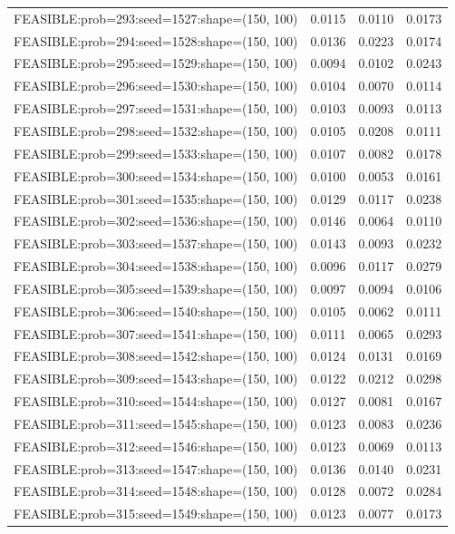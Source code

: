 \begin{longtable}{lccc}
FEASIBLE:prob=293:seed=1527:shape=(150, 100) &   0.0115 & 0.0110 & 0.0173 \\
FEASIBLE:prob=294:seed=1528:shape=(150, 100) &   0.0136 & 0.0223 & 0.0174 \\
FEASIBLE:prob=295:seed=1529:shape=(150, 100) &   0.0094 & 0.0102 & 0.0243 \\
FEASIBLE:prob=296:seed=1530:shape=(150, 100) &   0.0104 & 0.0070 & 0.0114 \\
FEASIBLE:prob=297:seed=1531:shape=(150, 100) &   0.0103 & 0.0093 & 0.0113 \\
FEASIBLE:prob=298:seed=1532:shape=(150, 100) &   0.0105 & 0.0208 & 0.0111 \\
FEASIBLE:prob=299:seed=1533:shape=(150, 100) &   0.0107 & 0.0082 & 0.0178 \\
FEASIBLE:prob=300:seed=1534:shape=(150, 100) &   0.0100 & 0.0053 & 0.0161 \\
FEASIBLE:prob=301:seed=1535:shape=(150, 100) &   0.0129 & 0.0117 & 0.0238 \\
FEASIBLE:prob=302:seed=1536:shape=(150, 100) &   0.0146 & 0.0064 & 0.0110 \\
FEASIBLE:prob=303:seed=1537:shape=(150, 100) &   0.0143 & 0.0093 & 0.0232 \\
FEASIBLE:prob=304:seed=1538:shape=(150, 100) &   0.0096 & 0.0117 & 0.0279 \\
FEASIBLE:prob=305:seed=1539:shape=(150, 100) &   0.0097 & 0.0094 & 0.0106 \\
FEASIBLE:prob=306:seed=1540:shape=(150, 100) &   0.0105 & 0.0062 & 0.0111 \\
FEASIBLE:prob=307:seed=1541:shape=(150, 100) &   0.0111 & 0.0065 & 0.0293 \\
FEASIBLE:prob=308:seed=1542:shape=(150, 100) &   0.0124 & 0.0131 & 0.0169 \\
FEASIBLE:prob=309:seed=1543:shape=(150, 100) &   0.0122 & 0.0212 & 0.0298 \\
FEASIBLE:prob=310:seed=1544:shape=(150, 100) &   0.0127 & 0.0081 & 0.0167 \\
FEASIBLE:prob=311:seed=1545:shape=(150, 100) &   0.0123 & 0.0083 & 0.0236 \\
FEASIBLE:prob=312:seed=1546:shape=(150, 100) &   0.0123 & 0.0069 & 0.0113 \\
FEASIBLE:prob=313:seed=1547:shape=(150, 100) &   0.0136 & 0.0140 & 0.0231 \\
FEASIBLE:prob=314:seed=1548:shape=(150, 100) &   0.0128 & 0.0072 & 0.0284 \\
FEASIBLE:prob=315:seed=1549:shape=(150, 100) &   0.0123 & 0.0077 & 0.0173 \\

\end{longtable}
